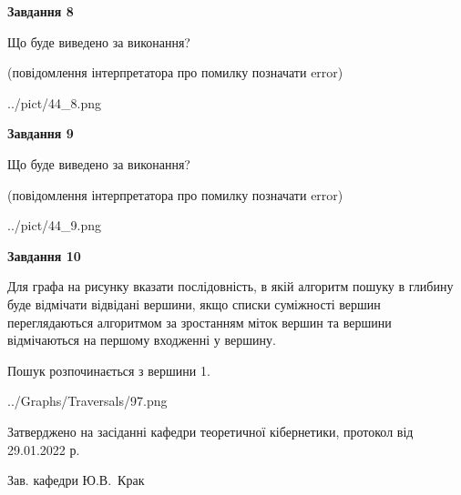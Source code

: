 \documentclass[12pt, ukrainian]{article}
\begin{document}
{\begin {large}
{\begin {center}\textbf{Завдання 8}\end {center}}\par
Що буде виведено за виконання?\par
 (повідомлення інтерпретатора про помилку позначати error)\par
\begin{center}
	{../pict/44_8.png}
\end{center}
\newpage

{\begin {center}\textbf{Завдання 9}\end {center}}\par
Що буде виведено за виконання?\par
 (повідомлення інтерпретатора про помилку позначати error)\par
\begin{center}
	{../pict/44_9.png}
\end{center}
\newpage

{\begin {center}\textbf{Завдання 10}\end {center}}\par
Для графа на рисунку вказати послідовність, в якій алгоритм пошуку в глибину буде відмічати відвідані вершини, якщо списки суміжності вершин переглядаються алгоритмом за зростанням міток вершин та вершини відмічаються на першому вход\-женні у вершину.\par
Пошук розпочинається з вершини 1.\par

\begin{center}
	{../Graphs/Traversals/97.png}
\end{center}\par
\newpage


\end {large}
}
{\smallskip \begin {small} Затверджено на засіданні кафедри теоретичної кібернетики, протокол  від   29.01.2022 р.\par\smallskip\smallskip
{\parbox {6.5 cm}{Зав. кафедри \dotfill Ю.В.~Крак}} \end{small}}
\end{document}
